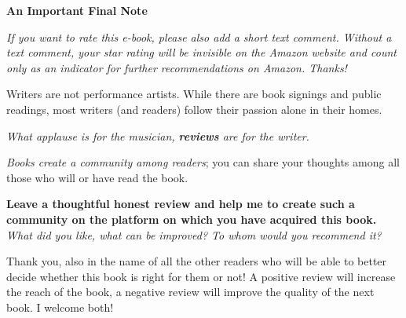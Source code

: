

\textbf{An Important Final Note}

\ifxetex \else \textit{If you want to rate this e-book, please also add a short text comment. Without a text comment, your star rating will be invisible on the Amazon website and count only as an indicator for further recommendations on Amazon. Thanks!}\fi

Writers are not performance artists. While there are book signings and public readings, most writers (and readers) follow their passion alone in their homes.

\textit{What applause is for the musician, \textbf{reviews} are for the writer.} 

\textit{Books create a community among readers}; you can share your thoughts among all those who will or have read the book.

\textbf{Leave a thoughtful honest review and help me to create such a community on the platform on which you have acquired this book.} \textit{What did you like, what can be improved? To whom would you recommend it?} 

Thank you, also in the name of all the other readers who will be able to better decide whether this book is right for them or not! A positive review will increase the reach of the book, a negative review will improve the quality of the next book. I welcome both!